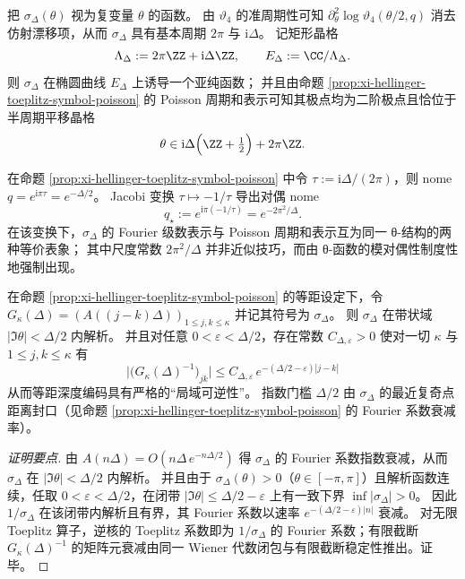 \begin{remark}[椭圆延拓与半周期二阶极点晶格]\label{rem:xi-hellinger-toeplitz-elliptic-extension-halfperiod-poles}
把 \(\sigma_\Delta(\theta)\) 视为复变量 \(\theta\) 的函数。
由 \(\vartheta_4\) 的准周期性可知 \(\partial_\theta^2\log\vartheta_4(\theta/2,q)\) 消去仿射漂移项，从而 \(\sigma_\Delta\) 具有基本周期 \(2\pi\) 与 \(\mathrm{i}\Delta\)。
记矩形晶格
\[
\Lambda_\Delta:=2\pi\ZZ+\mathrm{i}\Delta\ZZ,
\qquad
E_\Delta:=\CC/\Lambda_\Delta.
\]
则 \(\sigma_\Delta\) 在椭圆曲线 \(E_\Delta\) 上诱导一个亚纯函数；
并且由命题 \ref{prop:xi-hellinger-toeplitz-symbol-poisson} 的 Poisson 周期和表示可知其极点均为二阶极点且恰位于半周期平移晶格
\[
\theta\in \mathrm{i}\Delta\Bigl(\ZZ+\tfrac12\Bigr)+2\pi\ZZ.
\]
\end{remark}

\begin{remark}\label{rem:xi-hellinger-toeplitz-modular-duality-scale}
在命题 \ref{prop:xi-hellinger-toeplitz-symbol-poisson} 中令 \(\tau:=\mathrm{i}\Delta/(2\pi)\)，则 nome \(q=e^{\mathrm{i}\pi\tau}=e^{-\Delta/2}\)。
Jacobi 变换 \(\tau\mapsto -1/\tau\) 导出对偶 nome
\[
q_\star:=e^{\mathrm{i}\pi(-1/\tau)}=e^{-2\pi^{2}/\Delta}.
\]
在该变换下，\(\sigma_\Delta\) 的 Fourier 级数表示与 Poisson 周期和表示互为同一 θ-结构的两种等价表象；
其中尺度常数 \(2\pi^{2}/\Delta\) 并非近似技巧，而由 θ-函数的模对偶性制度性地强制出现。
\end{remark}

\begin{proposition}\label{prop:xi-hellinger-toeplitz-inverse-localization}
在命题 \ref{prop:xi-hellinger-toeplitz-symbol-poisson} 的等距设定下，令
\(
G_\kappa(\Delta)=(A((j-k)\Delta))_{1\le j,k\le \kappa}
\)
并记其符号为 \(\sigma_\Delta\)。
则 \(\sigma_\Delta\) 在带状域 \(|\Im\theta|<\Delta/2\) 内解析。
并且对任意 \(0<\varepsilon<\Delta/2\)，存在常数 \(C_{\Delta,\varepsilon}>0\) 使对一切 \(\kappa\) 与 \(1\le j,k\le\kappa\) 有
\[
\boxed{\;
\bigl|\bigl(G_\kappa(\Delta)^{-1}\bigr)_{jk}\bigr|
\le C_{\Delta,\varepsilon}\,e^{-(\Delta/2-\varepsilon)|j-k|}\;}
\]
从而等距深度编码具有严格的“局域可逆性”。
指数门槛 \(\Delta/2\) 由 \(\sigma_\Delta\) 的最近复奇点距离封口（见命题 \ref{prop:xi-hellinger-toeplitz-symbol-poisson} 的 Fourier 系数衰减率）。
\end{proposition}
\begin{proof}[证明要点]
由 \(A(n\Delta)=O(n\Delta\,e^{-n\Delta/2})\) 得 \(\sigma_\Delta\) 的 Fourier 系数指数衰减，从而 \(\sigma_\Delta\) 在 \(|\Im\theta|<\Delta/2\) 内解析。
并且由于 \(\sigma_\Delta(\theta)>0\)（\(\theta\in[-\pi,\pi]\)）且解析函数连续，任取 \(0<\varepsilon<\Delta/2\)，在闭带 \(|\Im\theta|\le \Delta/2-\varepsilon\) 上有一致下界 \(\inf|\sigma_\Delta|>0\)。
因此 \(1/\sigma_\Delta\) 在该闭带内解析且有界，其 Fourier 系数以速率 \(e^{-(\Delta/2-\varepsilon)|n|}\) 衰减。
对无限 Toeplitz 算子，逆核的 Toeplitz 系数即为 \(1/\sigma_\Delta\) 的 Fourier 系数；有限截断 \(G_\kappa(\Delta)^{-1}\) 的矩阵元衰减由同一 Wiener 代数闭包与有限截断稳定性推出。证毕。
\end{proof}

